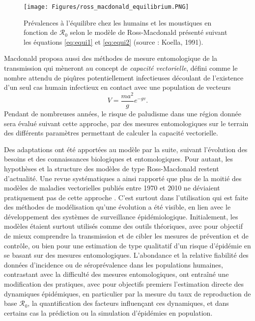 \begin{figure}[t]
	\centering
	\texttt{[image: Figures/ross\_macdonald\_equilibrium.PNG]}
	\caption{Prévalences à l'équilibre chez les humains et les moustiques en fonction de $\mathcal{R}_0$ selon le modèle de Ross-Macdonald présenté suivant les équations \ref{eq:equi1} et \ref{eq:equi2} (source : Koella, 1991).}
	\label{fig:equilibrium}
\end{figure}


Macdonald proposa aussi des méthodes de mesure entomologique de la transmission qui mèneront au concept de {\em capacité vectorielle}, défini comme le nombre attendu de piqûres potentiellement infectieuses découlant de l'existence d'un seul cas humain infectieux en contact avec une population de vecteurs 
\begin{equation}
V = \frac{ma^2}{g}e^{-gv}.
\end{equation}
Pendant de nombreuses années, le risque de paludisme dans une région donnée sera évalué suivant cette approche, par des mesures entomologiques sur le terrain des différents paramètres permettant de calculer la capacité vectorielle.

Des adaptations ont été apportées au modèle par la suite, suivant l'évolution des besoins et des connaissances biologiques et entomologiques.
Pour autant, les hypothèses et la structure des modèles de type Ross-Macdonald restent d'actualité. 
Une revue systématiques a ainsi rapporté que plus de la moitié des modèles de maladies vectorielles publiés entre 1970 et 2010 ne déviaient pratiquement pas de cette approche \cite{reiner_systematic_2013}.
C'est surtout dans l'utilisation qui est faite des méthodes de modélisation qu'une évolution a été visible, en lien avec le développement des systèmes de surveillance épidémiologique.
Initialement, les modèles étaient surtout utilisés comme des outils théoriques, avec pour objectif de mieux comprendre la transmission et de cibler les mesures de prévention et de contrôle, ou bien pour une estimation de type qualitatif d'un risque d'épidémie en se basant sur des mesures entomologiques.
L'abondance et la relative fiabilité des données d'incidence ou de séroprévalence dans les populations humaines, contrastant avec la difficulté des mesures entomologiques, ont entraîné une modification des pratiques, avec pour objectifs premiers l'estimation directe des dynamiques épidémiques, en particulier par la mesure du taux de reproduction de base $\mathcal{R}_0$, la quantification des facteurs influençant ces dynamiques, et dans certains cas la prédiction ou la simulation d'épidémies en population.

